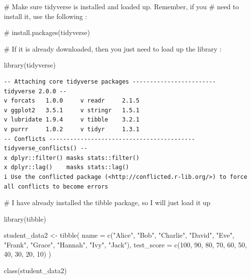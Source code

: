 \documentclass[
  letterpaper,
  DIV=11,
  numbers=noendperiod]{scrreprt}
\newenvironment{Shaded}{\begin{snugshade}}{\end{snugshade}}
\newcommand{\AttributeTok}[1]{\textcolor[rgb]{0.40,0.45,0.13}{#1}}
\newcommand{\CommentTok}[1]{\textcolor[rgb]{0.37,0.37,0.37}{#1}}
\newcommand{\DecValTok}[1]{\textcolor[rgb]{0.68,0.00,0.00}{#1}}
\newcommand{\FunctionTok}[1]{\textcolor[rgb]{0.28,0.35,0.67}{#1}}
\newcommand{\NormalTok}[1]{\textcolor[rgb]{0.00,0.23,0.31}{#1}}
\newcommand{\OtherTok}[1]{\textcolor[rgb]{0.00,0.23,0.31}{#1}}
\newcommand{\StringTok}[1]{\textcolor[rgb]{0.13,0.47,0.30}{#1}}
\begin{document}
\begin{Shaded}
\begin{Highlighting}[]
\CommentTok{\# Make sure tidyverse is installed and loaded up. Remember, if you}
\CommentTok{\# need to install it, use the following :}

\CommentTok{\# install.packages(tidyverse)}
\end{Highlighting}
\end{Shaded}

\begin{Shaded}
\begin{Highlighting}[]
\CommentTok{\# If it is already downloaded, then you just need to load up the library :}

\FunctionTok{library}\NormalTok{(tidyverse)}
\end{Highlighting}
\end{Shaded}

\begin{verbatim}
-- Attaching core tidyverse packages ------------------------ tidyverse 2.0.0 --
v forcats   1.0.0     v readr     2.1.5
v ggplot2   3.5.1     v stringr   1.5.1
v lubridate 1.9.4     v tibble    3.2.1
v purrr     1.0.2     v tidyr     1.3.1
-- Conflicts ------------------------------------------ tidyverse_conflicts() --
x dplyr::filter() masks stats::filter()
x dplyr::lag()    masks stats::lag()
i Use the conflicted package (<http://conflicted.r-lib.org/>) to force all conflicts to become errors
\end{verbatim}

\begin{Shaded}
\begin{Highlighting}[]
\CommentTok{\# I have already installed the tibble package, so I will just load it up}

\FunctionTok{library}\NormalTok{(tibble)}

\NormalTok{student\_data2 }\OtherTok{\textless{}{-}} \FunctionTok{tibble}\NormalTok{(}
  \AttributeTok{name =} \FunctionTok{c}\NormalTok{(}\StringTok{"Alice"}\NormalTok{, }\StringTok{"Bob"}\NormalTok{, }\StringTok{"Charlie"}\NormalTok{, }\StringTok{"David"}\NormalTok{, }\StringTok{"Eve"}\NormalTok{, }\StringTok{"Frank"}\NormalTok{, }\StringTok{"Grace"}\NormalTok{, }\StringTok{"Hannah"}\NormalTok{, }\StringTok{"Ivy"}\NormalTok{, }\StringTok{"Jack"}\NormalTok{),}
  \AttributeTok{test\_score =} \FunctionTok{c}\NormalTok{(}\DecValTok{100}\NormalTok{, }\DecValTok{90}\NormalTok{, }\DecValTok{80}\NormalTok{, }\DecValTok{70}\NormalTok{, }\DecValTok{60}\NormalTok{, }\DecValTok{50}\NormalTok{, }\DecValTok{40}\NormalTok{, }\DecValTok{30}\NormalTok{, }\DecValTok{20}\NormalTok{, }\DecValTok{10}\NormalTok{)}
\NormalTok{)}

\FunctionTok{class}\NormalTok{(student\_data2)}
\end{Highlighting}
\end{Shaded}
\end{document}
